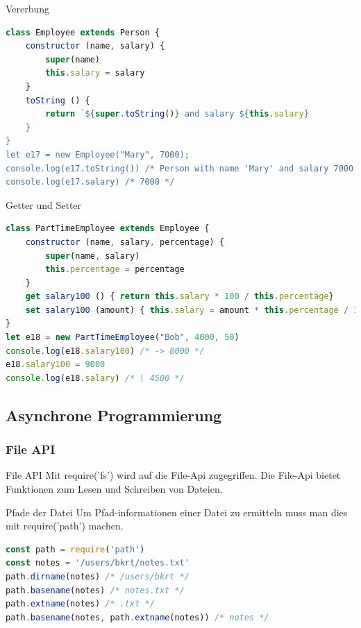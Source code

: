 \begin{code}{Vererbung}
\begin{lstlisting}[language=JavaScript, style=basesmol]
class Employee extends Person {
    constructor (name, salary) {
        super(name)
        this.salary = salary
    }
    toString () {
        return `${super.toString()} and salary ${this.salary}
    }
}
let e17 = new Employee("Mary", 7000);
console.log(e17.toString()) /* Person with name 'Mary' and salary 7000 */
console.log(e17.salary) /* 7000 */
\end{lstlisting}
\end{code}

\begin{examplecode}{Getter und Setter}
\begin{lstlisting}[language=JavaScript, style=basesmol]
class PartTimeEmployee extends Employee {
    constructor (name, salary, percentage) {
        super(name, salary)
        this.percentage = percentage
    }
    get salary100 () { return this.salary * 100 / this.percentage}
    set salary100 (amount) { this.salary = amount * this.percentage / 100 }
}
let e18 = new PartTimeEmployee("Bob", 4000, 50)
console.log(e18.salary100) /* -> 8000 */
e18.salary100 = 9000
console.log(e18.salary) /* \ 4500 */
\end{lstlisting}
\end{examplecode}

\columnbreak



\subsection{Asynchrone Programmierung}

\subsubsection{File API}

\begin{definition}{File API}
    Mit require('fs') wird auf die File-Api zugegriffen.
    Die File-Api bietet Funktionen zum Lesen und Schreiben von Dateien.
\end{definition}

\begin{code}{Pfade der Datei}
Um Pfad-informationen einer Datei zu ermitteln muss man dies mit require('path') machen.
\begin{lstlisting}[language=JavaScript, style=basesmol]
const path = require('path')
const notes = '/users/bkrt/notes.txt'
path.dirname(notes) /* /users/bkrt */
path.basename(notes) /* notes.txt */
path.extname(notes) /* .txt */
path.basename(notes, path.extname(notes)) /* notes */
\end{lstlisting}
\end{code}

